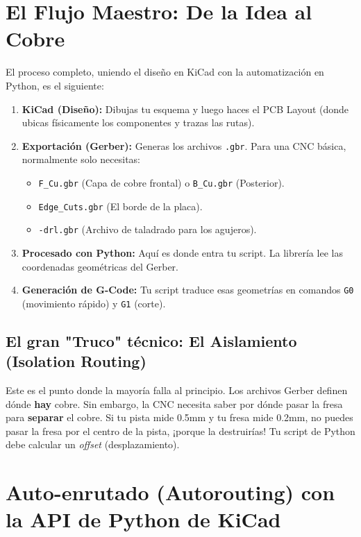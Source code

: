 \documentclass[12pt, a4paper]{article}
\begin{document}
\section{El Flujo Maestro: De la Idea al Cobre}

El proceso completo, uniendo el diseño en KiCad con la automatización en Python, es el siguiente:

\begin{enumerate}
    \item \textbf{KiCad (Diseño):} Dibujas tu esquema y luego haces el PCB Layout (donde ubicas físicamente los componentes y trazas las rutas).
    \item \textbf{Exportación (Gerber):} Generas los archivos \texttt{.gbr}. Para una CNC básica, normalmente solo necesitas:
    \begin{itemize}
        \item \texttt{F\_Cu.gbr} (Capa de cobre frontal) o \texttt{B\_Cu.gbr} (Posterior).
        \item \texttt{Edge\_Cuts.gbr} (El borde de la placa).
        \item \texttt{-drl.gbr} (Archivo de taladrado para los agujeros).
    \end{itemize}
    \item \textbf{Procesado con Python:} Aquí es donde entra tu script. La librería lee las coordenadas geométricas del Gerber.
    \item \textbf{Generación de G-Code:} Tu script traduce esas geometrías en comandos \texttt{G0} (movimiento rápido) y \texttt{G1} (corte).
\end{enumerate}

\subsection{El gran "Truco" técnico: El Aislamiento (Isolation Routing)}

Este es el punto donde la mayoría falla al principio. Los archivos Gerber definen dónde \textbf{hay} cobre. Sin embargo, la CNC necesita saber por dónde pasar la fresa para \textbf{separar} el cobre. Si tu pista mide 0.5mm y tu fresa mide 0.2mm, no puedes pasar la fresa por el centro de la pista, ¡porque la destruirías! Tu script de Python debe calcular un \textit{offset} (desplazamiento).

\section{Auto-enrutado (Autorouting) con la API de Python de KiCad}
\end{document}
